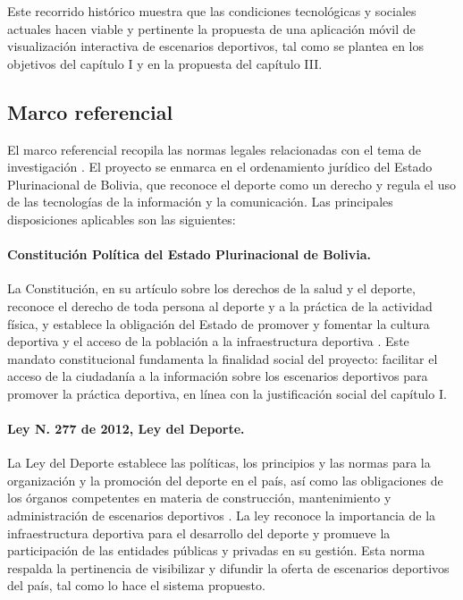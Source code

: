 Este recorrido hist\'orico muestra que las condiciones tecnol\'ogicas y
sociales actuales hacen viable y pertinente la propuesta de una aplicaci\'on
m\'ovil de visualizaci\'on interactiva de escenarios deportivos, tal como se
plantea en los objetivos del cap\'itulo I y en la propuesta del cap\'itulo III.

\subsection{Marco referencial}

El marco referencial recopila las normas legales relacionadas con el tema de
investigaci\'on \citep{arias2012}. El proyecto se enmarca en el ordenamiento
jur\'idico del Estado Plurinacional de Bolivia, que reconoce el deporte como un
derecho y regula el uso de las tecnolog\'ias de la informaci\'on y la
comunicaci\'on. Las principales disposiciones aplicables son las siguientes:

\paragraph{Constituci\'on Pol\'itica del Estado Plurinacional de Bolivia.} La
Constituci\'on, en su art\'iculo sobre los derechos de la salud y el deporte,
reconoce el derecho de toda persona al deporte y a la pr\'actica de la
actividad f\'isica, y establece la obligaci\'on del Estado de promover y
fomentar la cultura deportiva y el acceso de la poblaci\'on a la infraestructura
deportiva \citep{cpe2009}. Este mandato constitucional fundamenta la
finalidad social del proyecto: facilitar el acceso de la ciudadan\'ia a la
informaci\'on sobre los escenarios deportivos para promover la pr\'actica
deportiva, en l\'inea con la justificaci\'on social del cap\'itulo I.

\paragraph{Ley N.\textordmasculine{} 277 de 2012, Ley del Deporte.} La Ley
del Deporte establece las pol\'iticas, los principios y las normas para la
organizaci\'on y la promoci\'on del deporte en el pa\'is, as\'i como las
obligaciones de los \'organos competentes en materia de construcci\'on,
mantenimiento y administraci\'on de escenarios deportivos \citep{ley277}. La
ley reconoce la importancia de la infraestructura deportiva para el desarrollo
del deporte y promueve la participaci\'on de las entidades p\'ublicas y privadas
en su gesti\'on. Esta norma respalda la pertinencia de visibilizar y difundir
la oferta de escenarios deportivos del pa\'is, tal como lo hace el sistema
propuesto.

